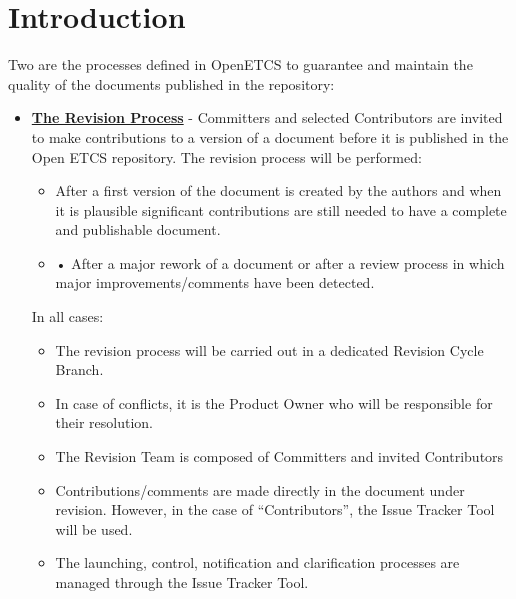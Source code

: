\documentclass{template/openetcs_article}
\begin{document}
\newpage

\section{Introduction}
Two are the processes defined in OpenETCS to guarantee and maintain the quality of the documents published in the repository:

\begin{itemize}
\item \underline{\textbf{The Revision Process}} -  
Committers and selected Contributors are invited to make contributions to a version of a document before it is published in the Open ETCS repository.
The revision process will be performed:
\begin{itemize}
\item After a first version of the document is created by the authors and when it is plausible significant contributions are still needed to have a complete and publishable document.
\item •	After a major rework of a document or after a review process in which major improvements/comments have been detected.
\end{itemize}
In all cases:
\begin{itemize}
\item The revision process will be carried out in a dedicated Revision Cycle Branch.
\item In case of conflicts, it is the Product Owner who will be responsible for their resolution.
\item The Revision Team is composed of Committers and invited Contributors
\item Contributions/comments are made directly in the document under revision. However, in the case of “Contributors”, the Issue Tracker Tool will be used.
\item The launching, control, notification and clarification processes are managed through the Issue Tracker Tool.
\end{itemize}


\end{itemize}
\end{document}

